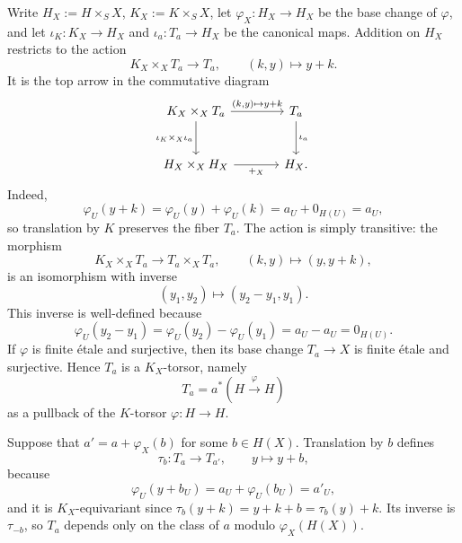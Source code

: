 Write $H_X:=H\times_S X$, $K_X:=K\times_S X$, let
$\varphi_X:H_X\to H_X$ be the base change of $\varphi$, and let
$\iota_K:K_X\to H_X$ and $\iota_a:T_a\to H_X$ be the canonical maps.
Addition on $H_X$ restricts to the action
\begin{equation}\label{eq:kernel_action_on_fiber}
K_X\times_X T_a\longrightarrow T_a,
\qquad (k,y)\longmapsto y+k.
\end{equation}
It is the top arrow in the commutative diagram
\[
\begin{tikzcd}[column sep=large, row sep=large]
K_X\times_X T_a
    \arrow[r,"{(k,y)\mapsto y+k}"]
    \arrow[d,"{\iota_K\times_X\iota_a}"']
  & T_a \arrow[d,"\iota_a"] \\
H_X\times_X H_X
    \arrow[r,"+_X"']
  & H_X.
\end{tikzcd}
\]
Indeed,
\[
\varphi_U(y+k)
=\varphi_U(y)+\varphi_U(k)
=a_U+0_{H(U)}
=a_U,
\]
so translation by $K$ preserves the fiber $T_a$. The action is simply
transitive: the morphism
\begin{equation}\label{eq:torsor_difference_isomorphism}
K_X\times_X T_a\longrightarrow T_a\times_X T_a,
\qquad (k,y)\longmapsto (y,y+k),
\end{equation}
is an isomorphism with inverse
\[
(y_1,y_2)\longmapsto (y_2-y_1,y_1).
\]
This inverse is well-defined because
\[
\varphi_U(y_2-y_1)
=\varphi_U(y_2)-\varphi_U(y_1)
=a_U-a_U
=0_{H(U)}.
\]
If $\varphi$ is finite \'etale and surjective, then its base change
$T_a\to X$ is finite \'etale and surjective. Hence $T_a$ is a $K_X$-torsor,
namely
\[
T_a=a^*(H\xrightarrow{\varphi}H)
\]
as a pullback of the $K$-torsor $\varphi:H\to H$.

Suppose that $a'=a+\varphi_X(b)$ for some $b\in H(X)$. Translation by $b$
defines
\[
\tau_b:T_a\longrightarrow T_{a'},
\qquad y\longmapsto y+b,
\]
because
\[
\varphi_U(y+b_U)
=a_U+\varphi_U(b_U)
=a'_U,
\]
and it is $K_X$-equivariant since
$\tau_b(y+k)=y+k+b=\tau_b(y)+k$. Its inverse is $\tau_{-b}$, so $T_a$ depends
only on the class of $a$ modulo $\varphi_X(H(X))$.

